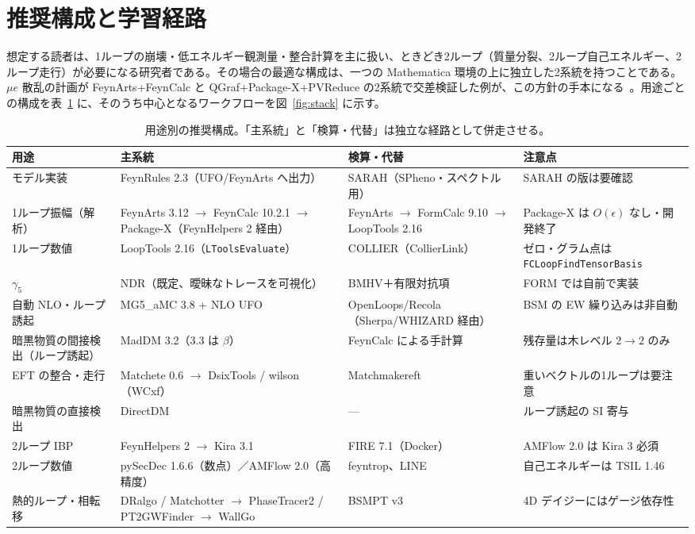 \documentclass[a4paper,10pt]{ltjsarticle}
\begin{document}
\section{推奨構成と学習経路}\label{sec:stack}

想定する読者は、1ループの崩壊・低エネルギー観測量・整合計算を主に扱い、ときどき2ループ（質量分裂、2ループ自己エネルギー、2ループ走行）が必要になる研究者である。その場合の最適な構成は、一つの Mathematica 環境の上に独立した2系統を持つことである。$\mu e$ 散乱の計画が FeynArts+FeynCalc と QGraf+Package-X+PVReduce の2系統で交差検証した例が、この方針の手本になる~\cite{r150}。用途ごとの構成を表~\ref{tab:stack} に、そのうち中心となるワークフローを図~\ref{fig:stack} に示す。

\begin{table}[tbp]
\centering\small
\caption{用途別の推奨構成。「主系統」と「検算・代替」は独立な経路として併走させる。}
\label{tab:stack}
\begin{tabularx}{\linewidth}{>{\raggedright\arraybackslash\hsize=0.68\hsize}X>{\raggedright\arraybackslash\hsize=1.39\hsize}X>{\raggedright\arraybackslash\hsize=0.86\hsize}X>{\raggedright\arraybackslash\hsize=1.07\hsize}X}
\toprule
\textbf{用途} & \textbf{主系統} & \textbf{検算・代替} & \textbf{注意点} \\
\midrule
モデル実装 & FeynRules 2.3（UFO/FeynArts へ出力） & SARAH（SPheno・スペクトル用） & SARAH の版は要確認 \\
1ループ振幅（解析） & FeynArts 3.12 $\to$ FeynCalc 10.2.1 $\to$ Package-X（FeynHelpers 2 経由） & FeynArts $\to$ FormCalc 9.10 $\to$ LoopTools 2.16 & Package-X は $O(\epsilon)$ なし・開発終了 \\
1ループ数値 & LoopTools 2.16（\texttt{LToolsEvaluate}） & COLLIER（CollierLink） & ゼロ・グラム点は \texttt{FCLoopFindTensorBasis} \\
$\gamma_5$ & NDR（既定、曖昧なトレースを可視化） & BMHV＋有限対抗項 & FORM では自前で実装 \\
自動 NLO・ループ誘起 & MG5\_aMC 3.8 + NLO UFO & OpenLoops/Recola（Sherpa/WHIZARD 経由） & BSM の EW 繰り込みは非自動 \\
暗黒物質の間接検出（ループ誘起） & MadDM 3.2（3.3 は $\beta$） & FeynCalc による手計算 & 残存量は木レベル $2\to 2$ のみ \\
EFT の整合・走行 & Matchete 0.6 $\to$ DsixTools / wilson（WCxf） & Matchmakereft & 重いベクトルの1ループは要注意 \\
暗黒物質の直接検出 & DirectDM & --- & ループ誘起の SI 寄与 \\
2ループ IBP & FeynHelpers 2 $\to$ Kira 3.1 & FIRE 7.1（Docker） & AMFlow 2.0 は Kira 3 必須 \\
2ループ数値 & pySecDec 1.6.6（数点）／AMFlow 2.0（高精度） & feyntrop、LINE & 自己エネルギーは TSIL 1.46 \\
熱的ループ・相転移 & DRalgo / Matchotter $\to$ PhaseTracer2 / PT2GWFinder $\to$ WallGo & BSMPT v3 & 4D デイジーにはゲージ依存性 \\
\bottomrule
\end{tabularx}
\end{table}
\end{document}
